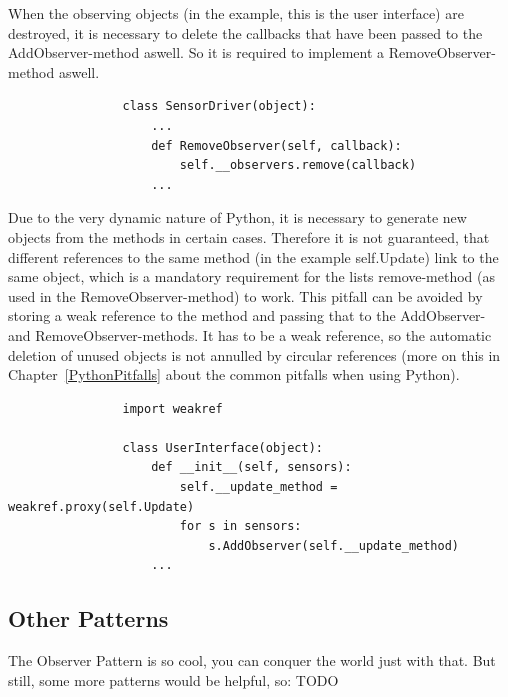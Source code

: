 			When the observing objects (in the example, this is the user interface) are destroyed, it is necessary to delete the callbacks that have been passed to the AddObserver-method aswell.
			So it is required to implement a RemoveObserver-method aswell.
			\begin{verbatim}
				class SensorDriver(object):
					...
					def RemoveObserver(self, callback):
						self.__observers.remove(callback)
					...
			\end{verbatim}
			Due to the very dynamic nature of Python, it is necessary to generate new objects from the methods in certain cases.
			Therefore it is not guaranteed, that different references to the same method (in the example self.Update) link to the same object, which is a mandatory requirement for the lists remove-method (as used in the RemoveObserver-method) to work.
			This pitfall can be avoided by storing a weak reference to the method and passing that to the AddObserver- and RemoveObserver-methods.
			It has to be a weak reference, so the automatic deletion of unused objects is not annulled by circular references (more on this in Chapter~\ref{PythonPitfalls} about the common pitfalls when using Python).
			\begin{verbatim}
				import weakref

				class UserInterface(object):
					def __init__(self, sensors):
						self.__update_method = weakref.proxy(self.Update)
						for s in sensors:
							s.AddObserver(self.__update_method)
					...
			\end{verbatim}


		\subsection{Other Patterns}
			The Observer Pattern is so cool, you can conquer the world just with that.
			But still, some more patterns would be helpful, so: TODO

